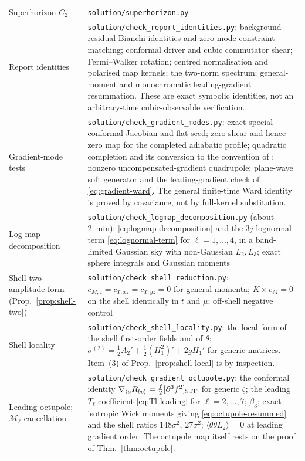 \documentclass[11pt]{article}
\theoremstyle{definition}
\theoremstyle{remark}
\newcommand{\ens}[1]{\langle #1\rangle}
\newcommand{\code}[1]{\texttt{#1}}
\begin{document}
\begin{longtable}{p{6.2cm}p{8.8cm}}
Superhorizon $C_2$ & \code{solution/superhorizon.py}\\
Report identities & \code{solution/check\_report\_identities.py}: background residual Bianchi identities and zero-mode constraint matching; conformal driver and cubic commutator shear; Fermi--Walker rotation; centred normalisation and polarised map kernels; the two-norm spectrum; general-moment and monochromatic leading-gradient resummation. These are exact symbolic identities, not an arbitrary-time cubic-observable verification.\\
Gradient-mode tests & \code{solution/check\_gradient\_modes.py}: exact special-conformal Jacobian and flat seed; zero shear and hence zero map for the completed adiabatic profile; quadratic completion and its conversion to the convention of \cite{MirbabayiZaldarriaga}; nonzero uncompensated-gradient quadrupole; plane-wave soft generator and the leading-gradient check of \eqref{eq:gradient-ward}. The general finite-time Ward identity is proved by covariance, not by full-kernel substitution.\\
Log-map decomposition & \code{solution/check\_logmap\_decomposition.py} (about 2~min): \eqref{eq:logmap-decomposition} and the $3j$ lognormal term \eqref{eq:lognormal-term} for $\ell=1,\dots,4$, in a band-limited Gaussian sky with non-Gaussian $L_2,L_3$; exact sphere integrals and Gaussian moments\\
Shell two-amplitude form (Prop.~\ref{prop:shell-two}) & \code{solution/check\_shell\_reduction.py}: $c_{M,z}=c_{T,xz}=c_{T,yz}=0$ for general momenta; $K\times c_M=0$ on the shell identically in $t$ and $\mu$; off-shell negative control\\
Shell locality & \code{solution/check\_shell\_locality.py}: the local form of the shell first-order fields and of $\theta$; $\sigma^{(2)}=\frac12A_2'+\frac12(H_1^2)'+2gH_1'$ for generic matrices. Item~(3) of Prop.~\ref{prop:shell-local} is by inspection.\\
Leading octupole; $\mathcal M_\ell$ cancellation & \code{solution/check\_gradient\_octupole.py}: the conformal identity $\nabla_{\langle a}R_{bc\rangle}=\frac f2[\partial^3f^2]_{\rm STF}$ for generic $\zeta$; the leading $T_\ell$ coefficient \eqref{eq:Tl-leading} for $\ell=2,\dots,7$; $\beta_3$; exact isotropic Wick moments giving \eqref{eq:octupole-resummed} and the shell ratios $148\sigma^2$, $27\sigma^2$; $\ens{\theta\theta L_2}=0$ at leading gradient order. The octupole map itself rests on the proof of Thm.~\ref{thm:octupole}.\\

\end{longtable}
\end{document}
